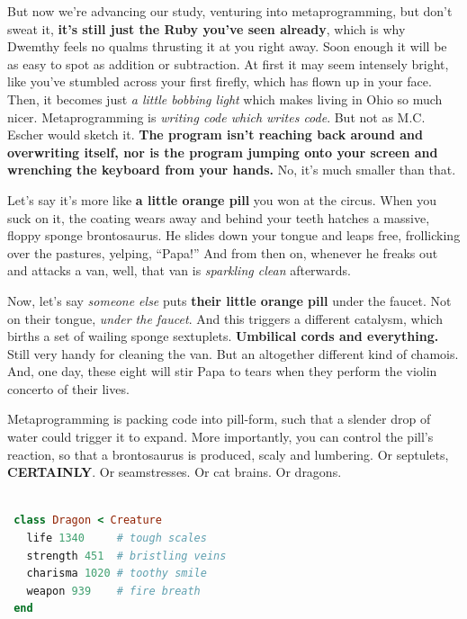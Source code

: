 \documentclass[10pt,twoside]{report}
\begin{document}
But now we're advancing our study, venturing into metaprogramming, but
don't sweat it, {\bf it's still just the Ruby you've seen already},
which is why Dwemthy feels no qualms thrusting it at you right away.
Soon enough it will be as easy to spot as addition or subtraction.  At
first it may seem intensely bright, like you've stumbled across your
first firefly, which has flown up in your face.  Then, it becomes just
{\em a little bobbing light} which makes living in Ohio so much nicer.
Metaprogramming is {\em writing code which writes code}.  But not as
M.C. Escher would sketch it.  {\bf The program isn't reaching back
  around and overwriting itself, nor is the program jumping onto your
  screen and wrenching the keyboard from your hands.}  No, it's much
smaller than that.

Let's say it's more like {\bf a little orange pill} you won at the
circus.  When you suck on it, the coating wears away and behind your
teeth hatches a massive, floppy sponge brontosaurus.  He slides down
your tongue and leaps free, frollicking over the pastures, yelping,
``Papa!''  And from then on, whenever he freaks out and attacks a van,
well, that van is {\em sparkling clean} afterwards.

Now, let's say {\em someone else} puts {\bf their little orange pill}
under the faucet.  Not on their tongue, {\em under the faucet}.  And
this triggers a different catalysm, which births a set of wailing
sponge sextuplets.  {\bf Umbilical cords and everything.}  Still very
handy for cleaning the van. But an altogether different kind of
chamois.  And, one day, these eight will stir Papa to tears when they
perform the violin concerto of their lives.

Metaprogramming is packing code into pill-form, such that a slender
drop of water could trigger it to expand. More importantly, you can
control the pill's reaction, so that a brontosaurus is produced, scaly
and lumbering. Or septulets, {\bf CERTAINLY}.  Or seamstresses.  Or
cat brains.  Or dragons.


\begin{lstlisting}[basicstyle=\ttfamily\color{basiccolor},
    commentstyle = \ttfamily\color{commentcolor},
    keywordstyle=\ttfamily\color{keywordscolor},
    stringstyle=\color{stringcolor},
    language=Ruby,
    basicstyle=\small\ttfamily,
    showstringspaces=false,
  ]

 class Dragon < Creature
   life 1340     # tough scales
   strength 451  # bristling veins
   charisma 1020 # toothy smile
   weapon 939    # fire breath
 end

\end{lstlisting}
\end{document}
